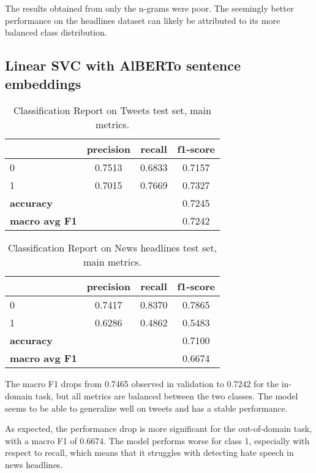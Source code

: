 \documentclass[a4paper, 9pt, twocolumn, DIV=calc]{scrartcl}
\begin{document}
The results obtained from only the n-grams were poor. The seemingly better performance on the headlines dataset can likely be attributed to its more balanced class distribution.

\subsection{Linear SVC with AlBERTo sentence embeddings}

\begin{table}[h]
    \small
    \centering
    \begin{tabular}{lccc}
        \toprule
        & \textbf{precision} & \textbf{recall} & \textbf{f1-score}  \\
        \midrule
        0 & 0.7513 & 0.6833 & 0.7157 \\
        1 & 0.7015 & 0.7669 & 0.7327 \\
        \midrule
        \textbf{accuracy} & & & 0.7245 \\
        \textbf{macro avg F1} &  &  & 0.7242 \\
        \bottomrule
    \end{tabular}
    \caption{Classification Report on Tweets test set, main metrics.}
    \label{tab:classification_report_svm_alberto_tweets}
\end{table}

\begin{table}[h]
    \small
    \centering
    \begin{tabular}{lccc}
        \toprule
        & \textbf{precision} & \textbf{recall} & \textbf{f1-score} \\
        \midrule
        0 & 0.7417 & 0.8370 & 0.7865 \\
        1 & 0.6286 & 0.4862 & 0.5483 \\
        \midrule
        \textbf{accuracy} & & & 0.7100 \\
        \textbf{macro avg F1} & & & 0.6674 \\
        \bottomrule
    \end{tabular}
    \caption{Classification Report on News headlines test set, main metrics.}
    \label{tab:classification_report_svm_alberto_news}
\end{table}
The macro F1 drops from 0.7465 observed in validation to 0.7242 for the in-domain task, but all metrics are balanced between the two classes. The model seems to be able to generalize well on tweets and has a stable performance.

As expected, the performance drop is more significant for the out-of-domain task, with a macro F1 of 0.6674. The model performs worse for class 1, especially with respect to recall, which means that it struggles with detecting hate speech in news headlines.
\end{document}
